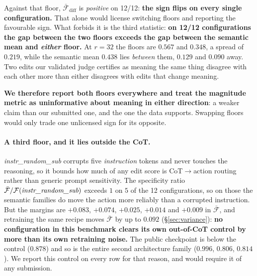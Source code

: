 \documentclass[11pt]{article}
\begin{document}
Against that floor, $\bar{\mathcal{F}}_{\text{diff}}$ is \emph{positive} on 12/12: \textbf{the sign flips on every single configuration.} That alone would license switching floors and reporting the favourable sign. What forbids it is the third statistic: \textbf{on 12/12 configurations the gap between the two floors exceeds the gap between the semantic mean and \emph{either} floor.} At $r{=}32$ the floors are $0.567$ and $0.348$, a spread of $0.219$, while the semantic mean $0.438$ lies \emph{between} them, $0.129$ and $0.090$ away. Two edits our validated judge certifies as meaning the same thing disagree with each other more than either disagrees with edits that change meaning.

\textbf{We therefore report both floors everywhere and treat the magnitude metric as uninformative about meaning in either direction}: a weaker claim than our submitted one, and the one the data supports. Swapping floors would only trade one unlicensed sign for its opposite.

\paragraph{A third floor, and it lies outside the CoT.} \emph{instr\_random\_sub} corrupts five \emph{instruction} tokens and never touches the reasoning, so it bounds how much of any edit score is CoT$\to$action routing rather than generic prompt sensitivity. The specificity ratio $\bar{\mathcal{F}}/\mathcal{F}(\emph{instr\_random\_sub})$ exceeds $1$ on $5$ of the 12 configurations, so on those the semantic families do move the action more reliably than a corrupted instruction. But the margins are $+0.083$, $+0.074$, $+0.025$, $+0.014$ and $+0.009$ in $\bar{\mathcal{F}}$, and retraining the same recipe moves $\bar{\mathcal{F}}$ by up to $0.092$ (\S\ref{sec:variance}): \textbf{no configuration in this benchmark clears its own out-of-CoT control by more than its own retraining noise.} The public checkpoint is below the control ($0.878$) and so is the entire second architecture family ($0.996$, $0.806$, $0.814$). We report this control on every row for that reason, and would require it of any submission.
\end{document}

